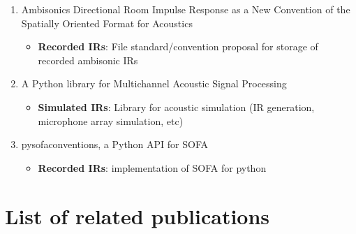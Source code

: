 \begin{itemize}
\begin{enumerate}
  		\item  Ambisonics Directional Room Impulse Response as a New Convention of the Spatially Oriented Format for Acoustics 
		\begin{itemize}
  			\item \textbf{Recorded IRs}: File standard/convention proposal for storage of recorded ambisonic IRs
		\end{itemize}
		
		\item A Python library for Multichannel Acoustic Signal Processing 
		\begin{itemize}
  			\item \textbf{Simulated IRs}: Library for acoustic simulation (IR generation, microphone array simulation, etc)
		\end{itemize}

  		\item pysofaconventions, a Python API for SOFA 
		\begin{itemize}
  			\item \textbf{Recorded IRs}: implementation of SOFA for python 
		\end{itemize}  		
  		
  		
	\end{enumerate}

\end{itemize}

\section{List of related publications}